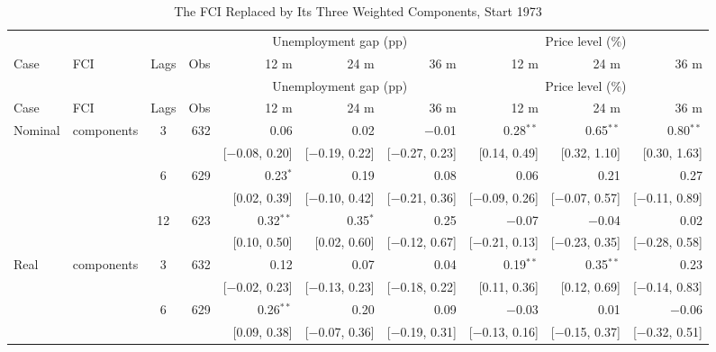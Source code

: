 \begingroup\scriptsize\setlength{\tabcolsep}{0.9pt}
\begin{longtable}{llcrrrrrrr}
\caption{The FCI Replaced by Its Three Weighted Components, Start 1973}\label{tab:appR473}\\
\toprule
 & & & & \multicolumn{3}{c}{Unemployment gap (pp)} & \multicolumn{3}{c}{Price level (\%)}\\ \cmidrule(lr){5-7}\cmidrule(lr){8-10}
Case & FCI & Lags & Obs & 12 m & 24 m & 36 m & 12 m & 24 m & 36 m\\
\midrule\endfirsthead
\toprule
 & & & & \multicolumn{3}{c}{Unemployment gap (pp)} & \multicolumn{3}{c}{Price level (\%)}\\ \cmidrule(lr){5-7}\cmidrule(lr){8-10}
Case & FCI & Lags & Obs & 12 m & 24 m & 36 m & 12 m & 24 m & 36 m\\
\midrule\endhead
\bottomrule\endfoot
Nominal & components & 3 & 632 & 0.06 & 0.02 & $-$0.01 & 0.28$^{**}$ & 0.65$^{**}$ & 0.80$^{**}$\\
 & & & & {\scriptsize [$-$0.08, 0.20]} & {\scriptsize [$-$0.19, 0.22]} & {\scriptsize [$-$0.27, 0.23]} & {\scriptsize [0.14, 0.49]} & {\scriptsize [0.32, 1.10]} & {\scriptsize [0.30, 1.63]}\\
 &  & 6 & 629 & 0.23$^{*}$ & 0.19 & 0.08 & 0.06 & 0.21 & 0.27\\
 & & & & {\scriptsize [0.02, 0.39]} & {\scriptsize [$-$0.10, 0.42]} & {\scriptsize [$-$0.21, 0.36]} & {\scriptsize [$-$0.09, 0.26]} & {\scriptsize [$-$0.07, 0.57]} & {\scriptsize [$-$0.11, 0.89]}\\
 &  & 12 & 623 & 0.32$^{**}$ & 0.35$^{*}$ & 0.25 & $-$0.07 & $-$0.04 & 0.02\\
 & & & & {\scriptsize [0.10, 0.50]} & {\scriptsize [0.02, 0.60]} & {\scriptsize [$-$0.12, 0.67]} & {\scriptsize [$-$0.21, 0.13]} & {\scriptsize [$-$0.23, 0.35]} & {\scriptsize [$-$0.28, 0.58]}\\
\addlinespace
Real & components & 3 & 632 & 0.12 & 0.07 & 0.04 & 0.19$^{**}$ & 0.35$^{**}$ & 0.23\\
 & & & & {\scriptsize [$-$0.02, 0.23]} & {\scriptsize [$-$0.13, 0.23]} & {\scriptsize [$-$0.18, 0.22]} & {\scriptsize [0.11, 0.36]} & {\scriptsize [0.12, 0.69]} & {\scriptsize [$-$0.14, 0.83]}\\
 &  & 6 & 629 & 0.26$^{**}$ & 0.20 & 0.09 & $-$0.03 & 0.01 & $-$0.06\\
 & & & & {\scriptsize [0.09, 0.38]} & {\scriptsize [$-$0.07, 0.36]} & {\scriptsize [$-$0.19, 0.31]} & {\scriptsize [$-$0.13, 0.16]} & {\scriptsize [$-$0.15, 0.37]} & {\scriptsize [$-$0.32, 0.51]}\\

\end{longtable}
